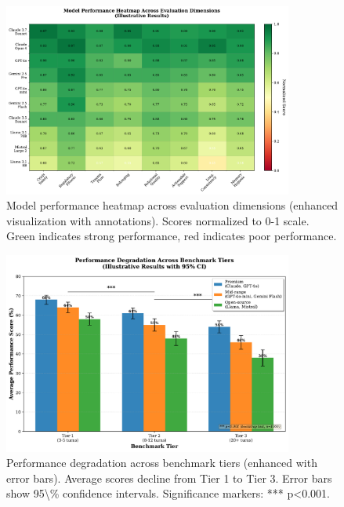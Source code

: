 \documentclass{article}%
\begin{document}
\begin{figure}[htbp]%
\centering%
\includegraphics[width=0.85\textwidth]{fig1_dimension_heatmap_ENHANCED.pdf}%
\caption{Model performance heatmap across evaluation dimensions (enhanced visualization with annotations). Scores normalized to 0{-}1 scale. Green indicates strong performance, red indicates poor performance.}%
\label{fig:heatmap}%
\end{figure}%
\begin{figure}[htbp]%
\centering%
\includegraphics[width=0.85\textwidth]{fig2_tier_performance_ENHANCED.pdf}%
\caption{Performance degradation across benchmark tiers (enhanced with error bars). Average scores decline from Tier 1 to Tier 3. Error bars show 95\textbackslash{}\% confidence intervals. Significance markers: *** p<0.001.}%
\label{fig:tier\_performance}%
\end{figure}%
\end{document}
